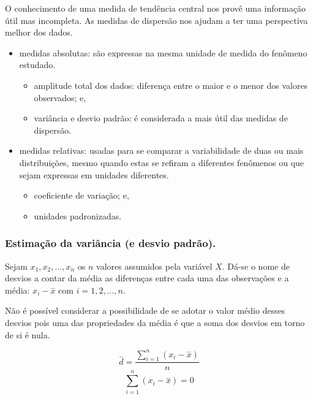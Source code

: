 \documentclass[
]{book}
\providecommand{\tightlist}{%
  \setlength{\itemsep}{0pt}\setlength{\parskip}{0pt}}
\begin{document}
O conhecimento de uma medida de tendência central nos provê uma informação útil mas incompleta. As medidas de dispersão nos ajudam a ter uma perspectiva melhor dos dados.

\begin{itemize}
\tightlist
\item
  medidas absolutas: são expressas na mesma unidade de medida do fenômeno estudado.

  \begin{itemize}
  \tightlist
  \item
    amplitude total dos dados: diferença entre o maior e o menor dos valores observados; e,
  \item
    variância e desvio padrão: é considerada a mais útil das medidas de dispersão.
  \end{itemize}
\end{itemize}

\hfill\break

\begin{itemize}
\tightlist
\item
  medidas relativas: usadas para se comparar a variabilidade de duas ou mais distribuições, mesmo quando estas se refiram a diferentes fenômenos ou que sejam expressas em unidades diferentes.

  \begin{itemize}
  \tightlist
  \item
    coeficiente de variação; e,
  \item
    unidades padronizadas.
  \end{itemize}
\end{itemize}

\hypertarget{estimauxe7uxe3o-da-variuxe2ncia-e-desvio-padruxe3o.}{%
\subsubsection{Estimação da variância (e desvio padrão).}\label{estimauxe7uxe3o-da-variuxe2ncia-e-desvio-padruxe3o.}}

Sejam \(x_{1}, x_{2}, ..., x_{n}\) os \(n\) valores assumidos pela variável \(X\). Dá-se o nome de desvios a contar da média as diferenças entre cada uma das observações e a média: \(x_{i} - \stackrel{-}{x}\) com \(i=1,2,...,n\).

Não é possível considerar a possibilidade de se adotar o valor médio desses desvios pois uma das propriedades da média é que a soma dos desvios em torno de si é nula.

\[
\stackrel{-}{d} = \frac{\sum _{i=1}^{n}\left(x_{i}-\stackrel{-}{x}\right)}{n}
\]
\[
\sum _{i=1}^{n}\left(x_{i}-\stackrel{-}{x}\right)=0
\]
\end{document}
